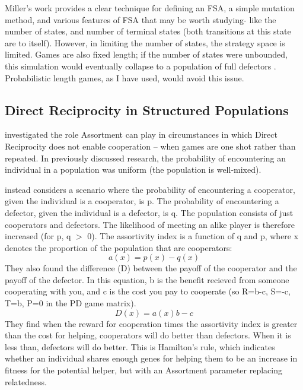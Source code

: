 \documentclass[a4paper,11pt,bcshonoursthesis,singlespace,oneside,thesisdraft,pdflatex]{cssethesis}
\begin{document}
Miller's work provides a clear technique for defining an FSA, a simple mutation method, and various features of FSA that may be worth studying- like the number of states, and number of terminal states (both transitions at this state are to itself). However, in limiting the number of states, the strategy space is limited. Games are also fixed length; if the number of states were unbounded, this simulation would eventually collapse to a population of full defectors \citep{aumann1995backward}. Probabilistic length games, as I have used, would avoid this issue.

\subsection{Direct Reciprocity in Structured Populations}
\label{sec:pnas}
\citet{bergstrom2003algebra} investigated the role Assortment can play in circumstances in which Direct Reciprocity does not enable cooperation -- when games are one shot rather than repeated. 
In previously discussed research, the probability of encountering an individual in a population was uniform (the population is well-mixed). 

\citet{bergstrom2003algebra} instead considers a scenario where the probability of encountering a cooperator, given the individual is a cooperator, is p. The probability of encountering a defector, given the individual is a defector, is q. 
The population consists of just cooperators and defectors. The likelihood of meeting an alike player is therefore increased (for p, q $>$ 0). The assortivity index is a function of q and p, where x denotes the proportion of the population that are cooperators:
\begin{equation*}
a(x)=p(x)-q(x)
\end{equation*}
They also found the difference (D) between the payoff of the cooperator and the payoff of the defector. 
In this equation, b is the benefit recieved from someone cooperating with you, and c is the cost you pay to cooperate (so R=b-c, S=-c, T=b, P=0 in the PD game matrix).
\begin{equation}
D(x)=a(x)b-c
\end{equation}
They find when the reward for cooperation times the assortivity index is greater than the cost for helping, cooperators will do better than defectors. When it is less than, defectors will do better. 
This is Hamilton's rule, which indicates whether an individual shares enough genes for helping them to be an increase in fitness for the potential helper, but with an Assortment parameter replacing relatedness. 
\end{document}
